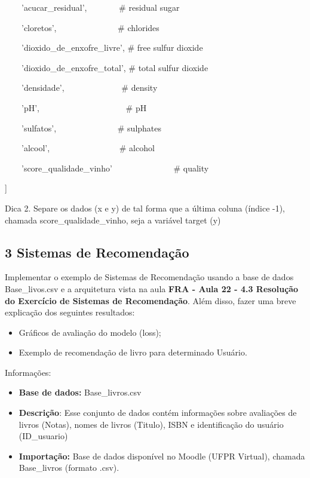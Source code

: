 \textcolor[HTML]{188038}{\ \ \ \ {}'acucar\_residual', \ \ \ \ \ \ \ \# residual sugar}

\textcolor[HTML]{188038}{\ \ \ \ {}'cloretos', \ \ \ \ \ \ \ \ \ \ \ \ \ \ \# chlorides}

\textcolor[HTML]{188038}{\ \ \ \ {}'dioxido\_de\_enxofre\_livre', \# free sulfur dioxide}

\textcolor[HTML]{188038}{\ \ \ \ {}'dioxido\_de\_enxofre\_total', \# total sulfur dioxide}

\textcolor[HTML]{188038}{\ \ \ \ {}'densidade', \ \ \ \ \ \ \ \ \ \ \ \ \ \# density}

\textcolor[HTML]{188038}{\ \ \ \ {}'pH', \ \ \ \ \ \ \ \ \ \ \ \ \ \ \ \ \ \ \ \ \# pH}

\textcolor[HTML]{188038}{\ \ \ \ {}'sulfatos', \ \ \ \ \ \ \ \ \ \ \ \ \ \ \# sulphates}

\textcolor[HTML]{188038}{\ \ \ \ {}'alcool', \ \ \ \ \ \ \ \ \ \ \ \ \ \ \ \ \# alcohol}

\textcolor[HTML]{188038}{\ \ \ \ {}'score\_qualidade\_vinho' \ \ \ \ \ \ \ \ \ \ \ \ \ \ \# quality}

\textcolor[HTML]{188038}{]}


\textcolor[HTML]{188038}{Dica 2. Separe os dados (x e y) de tal forma que a última coluna (índice -1), chamada
score\_qualidade\_vinho, seja a variável target (y)}


\subsection*{\textbf{3 Sistemas de Recomendação}}


Implementar o exemplo de Sistemas de Recomendação usando a base de dados Base\_livos.csv e a arquitetura vista na aula
\textbf{FRA - Aula 22 - 4.3 Resolução do Exercício de Sistemas de Recomendação}. Além disso, fazer uma breve explicação
dos seguintes resultados:

\begin{itemize}[series=listWWNumxv,label=${\bullet}$]
\item Gráficos de avaliação do modelo (loss);
\item Exemplo de recomendação de livro para determinado Usuário.
\end{itemize}
Informações:

\begin{itemize}[series=listWWNumxvii,label=${\bullet}$]
\item \textbf{Base de dados: }Base\_livros.csv
\item \textbf{Descrição}: Esse conjunto de dados contém informações sobre avaliações de livros (Notas), nomes de livros
(Titulo), ISBN e identificação do usuário (ID\_usuario)
\item \textbf{Importação: }Base de dados disponível no Moodle (UFPR Virtual), chamada Base\_livros (formato .csv).
\end{itemize}

